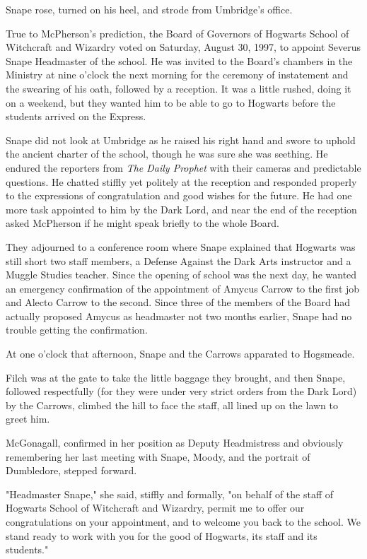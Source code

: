 Snape rose, turned on his heel, and strode from Umbridge's office.

True to McPherson's prediction, the Board of Governors of Hogwarts School of Witchcraft and Wizardry voted on Saturday, August 30, 1997, to appoint Severus Snape Headmaster of the school. He was invited to the Board's chambers in the Ministry at nine o'clock the next morning for the ceremony of instatement and the swearing of his oath, followed by a reception. It was a little rushed, doing it on a weekend, but they wanted him to be able to go to Hogwarts before the students arrived on the Express.

Snape did not look at Umbridge as he raised his right hand and swore to uphold the ancient charter of the school, though he was sure she was seething. He endured the reporters from \emph{The Daily Prophet} with their cameras and predictable questions. He chatted stiffly yet politely at the reception and responded properly to the expressions of congratulation and good wishes for the future. He had one more task appointed to him by the Dark Lord, and near the end of the reception asked McPherson if he might speak briefly to the whole Board.

They adjourned to a conference room where Snape explained that Hogwarts was still short two staff members, a Defense Against the Dark Arts instructor and a Muggle Studies teacher. Since the opening of school was the next day, he wanted an emergency confirmation of the appointment of Amycus Carrow to the first job and Alecto Carrow to the second. Since three of the members of the Board had actually proposed Amycus as headmaster not two months earlier, Snape had no trouble getting the confirmation.

At one o'clock that afternoon, Snape and the Carrows apparated to Hogsmeade.

Filch was at the gate to take the little baggage they brought, and then Snape, followed respectfully (for they were under very strict orders from the Dark Lord) by the Carrows, climbed the hill to face the staff, all lined up on the lawn to greet him.

McGonagall, confirmed in her position as Deputy Headmistress and obviously remembering her last meeting with Snape, Moody, and the portrait of Dumbledore, stepped forward.

"Headmaster Snape," she said, stiffly and formally, "on behalf of the staff of Hogwarts School of Witchcraft and Wizardry, permit me to offer our congratulations on your appointment, and to welcome you back to the school. We stand ready to work with you for the good of Hogwarts, its staff and its students."

